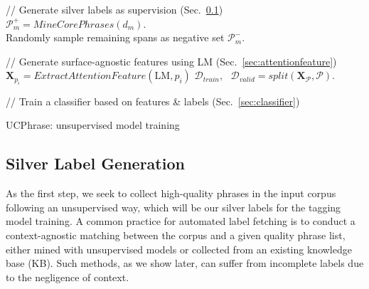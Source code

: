 \documentclass[sigconf]{acmart}
\newcommand{\our}{\mbox{UCPhrase}\xspace}
\newcommand{\algcomment}[1]{\textcolor{gblue}{{#1}}} \newcommand{\hlpgen}[2]{\fboxsep1pt \colorbox{ggreen!#2}{\strut #1}} \newcommand{\hlcov}[2]{\fboxsep1pt \colorbox{gyellow!#2}{\strut #1}} \newcommand{\error}[1]{\textcolor{gred}{\textbf{#1}}} \newcommand{\fph}[1]{\textcolor{ggreen}{\textbf{#1}}} \newcommand{\reph}[1]{\textcolor{ggreen}{\textbf{#1}}} \newcommand{\novelh}[1]{\textcolor{gblue}{\textbf{#1}}}
\begin{document}
\begin{algorithm}[t]
\small
{}
	
\algcomment{// Generate silver labels as supervision (Sec.~\ref{sec:labelgeneration})} \\ 
	 {
$\mathcal{P}^+_m = MineCorePhrases(d_m)$. \\
Randomly sample remaining spans as negative set $\mathcal{P}^-_m$.
	}
	
\algcomment{// Generate surface-agnostic features using LM (Sec.~\ref{sec:attentionfeature})} \\ 
	\vspace{-.2em}
	 {
$\mathbf{X}_{p_i} = ExtractAttentionFeature(\text{LM}, p_i)$
	}
	$\mathcal{D}_{train}, ~~~ \mathcal{D}_{valid} = split(\mathbf{X}_{\mathcal{P}}, \mathcal{P})$.
	
\algcomment{// Train a classifier based on features \& labels (Sec.~\ref{sec:classifier})} \\
	\caption{\our: unsupervised model training}
	\label{alg:main}
\end{algorithm} 


\subsection{Silver Label Generation}
\label{sec:labelgeneration}

As the first step, we seek to collect high-quality phrases in the input corpus following an unsupervised way, which will be our silver labels for the tagging model training.
A common practice for automated label fetching is to conduct a context-agnostic matching between the corpus and a given quality phrase list, either mined with unsupervised models or collected from an existing knowledge base (KB).
Such methods, as we show later, can suffer from incomplete labels due to the negligence of context.
\end{document}
